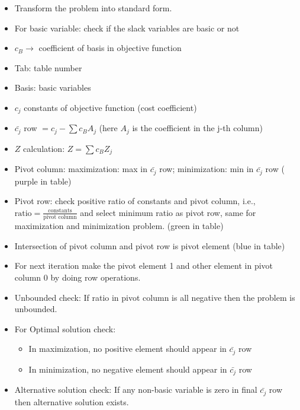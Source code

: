 \documentclass[../main-sheet.tex]{subfiles}
\begin{document}
\begin{itemize}
    \item Transform the problem into standard form.
    \item For basic variable: check if the slack variables are basic or not
    \item \(c_B\to\) coefficient of basis in objective function
    \item Tab: table number
    \item Basis: basic variables
    \item \(c_j\) constants of objective function (cost coefficient)
    \item \(\bar{c_j}\) row \(=c_j-\sum c_BA_j\) (here \(A_j\) is the coefficient in the j-th column)
    \item \(Z \) calculation: \(Z=\sum c_B Z_j\)
    \item Pivot column: maximization: max in \(\bar{c_j}\) row; minimization: min in \(\bar{c_j}\) row ({\color[HTML]{FFCCC9} purple} in table)
    \item Pivot row: check positive ratio of constants and pivot column, i.e., \(\text{ratio}=\frac{\text{constants}}{\text{pivot column}}\) and select minimum ratio as pivot row, same for maximization and minimization problem. ({\color[HTML]{9AFF99}green} in table)
    \item Intersection of pivot column and pivot row is pivot element ({\color[HTML]{96FFFB}blue} in table)
    \item For next iteration make the pivot element 1 and other element in pivot column 0 by doing row operations.
    \item Unbounded check: If ratio in pivot column is all negative then the problem is unbounded.
    \item For Optimal solution check:
          \begin{itemize}
              \item In maximization, no positive element should appear in \(\bar{c_j}\) row
              \item In minimization, no negative element should appear in \(\bar{c_j}\) row
          \end{itemize}
    \item Alternative solution check: If any non-basic variable is zero in final \(\bar{c_j}\) row then alternative solution exists.
\end{itemize}
\end{document}
